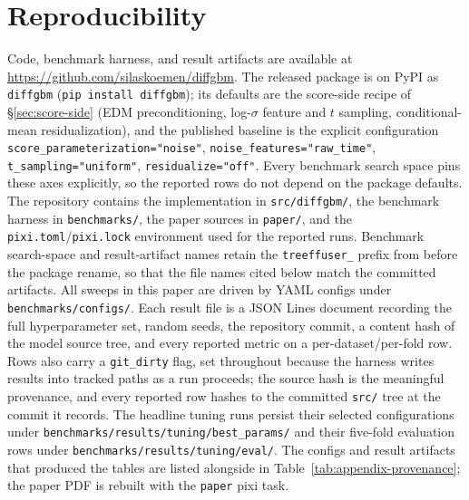 \documentclass{article}
\begin{document}
\section{Reproducibility}\label{app:repro}

Code, benchmark harness, and result artifacts are available at \url{https://github.com/silaskoemen/diffgbm}. The released package is on PyPI as \texttt{diffgbm} (\texttt{pip install diffgbm}); its defaults are the score-side recipe of \S\ref{sec:score-side} (EDM preconditioning, log-$\sigma$ feature and $t$ sampling, conditional-mean residualization), and the published baseline is the explicit configuration \texttt{score\_parameterization="noise"}, \texttt{noise\_features="raw\_time"}, \texttt{t\_sampling="uniform"}, \texttt{residualize="off"}. Every benchmark search space pins these axes explicitly, so the reported rows do not depend on the package defaults. The repository contains the implementation in \texttt{src/diffgbm/}, the benchmark harness in \texttt{benchmarks/}, the paper sources in \texttt{paper/}, and the \texttt{pixi.toml}/\texttt{pixi.lock} environment used for the reported runs. Benchmark search-space and result-artifact names retain the \texttt{treeffuser\_} prefix from before the package rename, so that the file names cited below match the committed artifacts. All sweeps in this paper are driven by YAML configs under \texttt{benchmarks/configs/}. Each result file is a JSON Lines document recording the full hyperparameter set, random seeds, the repository commit, a content hash of the model source tree, and every reported metric on a per-dataset/per-fold row. Rows also carry a \texttt{git\_dirty} flag, set throughout because the harness writes results into tracked paths as a run proceeds; the source hash is the meaningful provenance, and every reported row hashes to the committed \texttt{src/} tree at the commit it records. The headline tuning runs persist their selected configurations under \texttt{benchmarks/results/tuning/best\_params/} and their five-fold evaluation rows under \texttt{benchmarks/results/tuning/eval/}. The configs and result artifacts that produced the tables are listed alongside in Table~\ref{tab:appendix-provenance}; the paper PDF is rebuilt with the \texttt{paper} pixi task.
\end{document}
